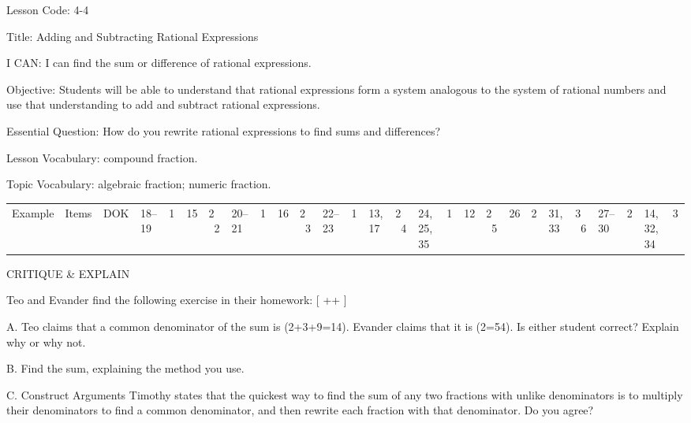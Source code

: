 \documentclass{article}
\newenvironment{lesson-meta}{}{}
\newenvironment{item-analysis}{}{}
\newenvironment{model-discuss}{}{}
\newcommand{\answer}[1]{}
\newcommand{\placeholder}[2]{}
\begin{document}
\begin{lesson-meta}
Lesson Code: 4-4

Title: Adding and Subtracting Rational Expressions

I CAN: I can find the sum or difference of rational expressions.

Objective: Students will be able to understand that rational expressions form a system analogous to the system of rational numbers and use that understanding to add and subtract rational expressions.

Essential Question: How do you rewrite rational expressions to find sums and differences?

Lesson Vocabulary: compound fraction.

Topic Vocabulary: algebraic fraction; numeric fraction.
\end{lesson-meta}

\begin{item-analysis}
\begin{tabular}{ccc}
\toprule
Example & Items & DOK \
 & 18--19 & 1 \
& 15 & 2 \
2 & 20--21 & 1 \
& 16 & 2 \
3 & 22--23 & 1 \
& 13, 17 & 2 \
4 & 24, 25, 35 & 1 \
& 12 & 2 \
5 & 26 & 2 \
& 31, 33 & 3 \
6 & 27--30 & 2 \
& 14, 32, 34 & 3 \
\bottomrule
\end{tabular}
\end{item-analysis}

\begin{model-discuss}
CRITIQUE & EXPLAIN

Teo and Evander find the following exercise in their homework:
[
\frac{1}{2}++
]

A. Teo claims that a common denominator of the sum is (2+3+9=14). Evander claims that it is (2=54). Is either student correct? Explain why or why not.

B. Find the sum, explaining the method you use.

C. Construct Arguments Timothy states that the quickest way to find the sum of any two fractions with unlike denominators is to multiply their denominators to find a common denominator, and then rewrite each fraction with that denominator. Do you agree?

\placeholder{illustration}{Computer or tablet screen showing the expression (1/2+1/3+1/9).}

\answer{A. Only Evander is correct. A common denominator will have each other denominator as a factor. B. (\frac{17}{18}); converted each fraction to a fraction with denominator 18. C. No; It may be faster to use the least common denominator rather than multiplying the denominators together.}
\end{model-discuss}
\end{document}
